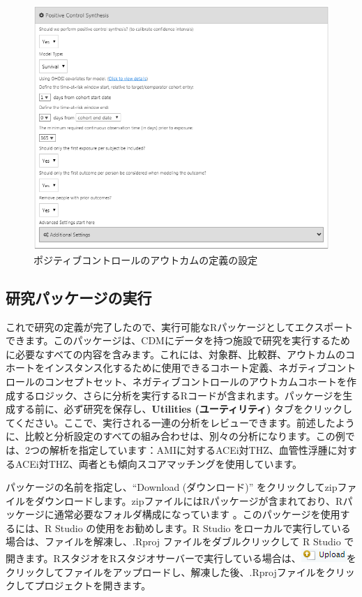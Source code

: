 \documentclass[
  11pt]{book}
\theoremstyle{definition}
\theoremstyle{definition}
\theoremstyle{definition}
\theoremstyle{definition}
\theoremstyle{remark}
\begin{document}
\begin{figure}

{\centering \includegraphics[width=1\linewidth]{images/PopulationLevelEstimation/pcSynthesis} 

}

\caption{ポジティブコントロールのアウトカムの定義の設定}\label{fig:pcSynthesis}
\end{figure}

\subsection{研究パッケージの実行}\label{ux7814ux7a76ux30d1ux30c3ux30b1ux30fcux30b8ux306eux5b9fux884c}

これで研究の定義が完了したので、実行可能なRパッケージとしてエクスポートできます。このパッケージは、CDMにデータを持つ施設で研究を実行するために必要なすべての内容を含みます。これには、対象群、比較群、アウトカムのコホートをインスタンス化するために使用できるコホート定義、ネガティブコントロールのコンセプトセット、ネガティブコントロールのアウトカムコホートを作成するロジック、さらに分析を実行するRコードが含まれます。パッケージを生成する前に、必ず研究を保存し、\textbf{Utilities (ユーティリティ)} タブをクリックしてください。ここで、実行される一連の分析をレビューできます。前述したように、比較と分析設定のすべての組み合わせは、別々の分析になります。この例では、2つの解析を指定しています：AMIに対するACEi対THZ、血管性浮腫に対するACEi対THZ、両者とも傾向スコアマッチングを使用しています。

パッケージの名前を指定し、``Download (ダウンロード)'' をクリックしてzipファイルをダウンロードします。zipファイルにはRパッケージが含まれており、Rパッケージに通常必要なフォルダ構成になっています \citep{Wickham_2015}。このパッケージを使用するには、R Studio の使用をお勧めします。R Studio をローカルで実行している場合は、ファイルを解凍し、.Rproj ファイルをダブルクリックして R Studio で開きます。RスタジオをRスタジオサーバーで実行している場合は、\includegraphics{images/PopulationLevelEstimation/upload.png}をクリックしてファイルをアップロードし、解凍した後、.Rprojファイルをクリックしてプロジェクトを開きます。
\end{document}
